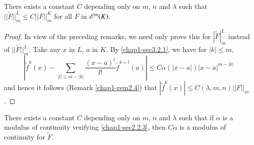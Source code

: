 \begin{Complement}\label{chap1-com3.5}
There exists a constant $C$ depending only on $m$, $n$ and $\lambda$ such that $||\widetilde{F}||^{L}_{m}\leq C||F||^{K}_{m}$ for all $F$ in $\mathscr{E}^{m}(K)$.
\end{Complement}

\begin{proof}
In view of the preceding remarks, we need only prove this for $|\widetilde{F}|^{L}_{m}$ instead of $||\widetilde{F}||^{L}_{m}$. Take any $x$ in $L$, $a$ in $K$. By \eqref{chap1-sec3.2.1}, we have for $|k|\leq m$,
$$
\left|\widetilde{f}^{k}(x)-\sum\limits_{|l|\leq m-|k|}\dfrac{(x-a)^{l}}{l!}\widetilde{f}^{k+l}(a)\right|\leq C\alpha(|x-a|)|x-a|^{m-|k|}
$$
and hence it follows (Remark \ref{chap1-rem2.4}) that $|\widetilde{f}^{k}(x)|\leq C(\lambda,m,n)||F||_{m}$.
\end{proof}

\begin{Complement}\label{chap1-com3.6}
There exists a constant $C$ depending only on $m$, $n$ and $\lambda$ such that if $\alpha$ is a modulus of continuity verifying \eqref{chap1-sec2.2.3}, then $C\alpha$ is a modulus of continuity for $\widetilde{F}$.
\end{Complement}

